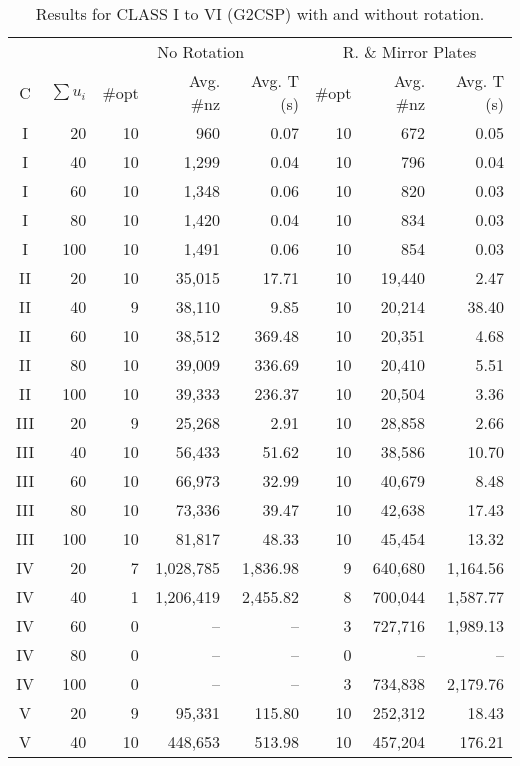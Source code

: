 \begin{table}[!t]
\centering
\caption{Results for CLASS I to VI (G2CSP) with and without rotation.}
\label{tab:g2csp_class_1to6_joined}
\begin{tabular}{crrrrrrr}
\hline\hline
& & \multicolumn{3}{c}{No Rotation} & \multicolumn{3}{c}{R. \& Mirror Plates} \\\cmidrule(lr){3-5}\cmidrule(lr){6-8}
C & \(\sum u_i\) & \#opt & Avg. \#nz & Avg. T (s) & \#opt & Avg. \#nz & Avg. T (s) \\\hline
I &  20 & 10 & 960 & 0.07 & 10 & 672 & 0.05 \\
I &  40 & 10 & 1,299 & 0.04 & 10 & 796 & 0.04 \\
I &  60 & 10 & 1,348 & 0.06 & 10 & 820 & 0.03 \\
I &  80 & 10 & 1,420 & 0.04 & 10 & 834 & 0.03 \\
I & 100 & 10 & 1,491 & 0.06 & 10 & 854 & 0.03 \\
II &  20 & 10 & 35,015 & 17.71 & 10 & 19,440 & 2.47 \\
II &  40 & 9 & 38,110 & 9.85 & 10 & 20,214 & 38.40 \\
II &  60 & 10 & 38,512 & 369.48 & 10 & 20,351 & 4.68 \\
II &  80 & 10 & 39,009 & 336.69 & 10 & 20,410 & 5.51 \\
II & 100 & 10 & 39,333 & 236.37 & 10 & 20,504 & 3.36 \\
III &  20 & 9 & 25,268 & 2.91 & 10 & 28,858 & 2.66 \\
III &  40 & 10 & 56,433 & 51.62 & 10 & 38,586 & 10.70 \\
III &  60 & 10 & 66,973 & 32.99 & 10 & 40,679 & 8.48 \\
III &  80 & 10 & 73,336 & 39.47 & 10 & 42,638 & 17.43 \\
III & 100 & 10 & 81,817 & 48.33 & 10 & 45,454 & 13.32 \\
IV &  20 & 7 & 1,028,785 & 1,836.98 & 9 & 640,680 & 1,164.56 \\
IV &  40 & 1 & 1,206,419 & 2,455.82 & 8 & 700,044 & 1,587.77 \\
IV &  60 & 0 & -- & -- & 3 & 727,716 & 1,989.13 \\
IV &  80 & 0 & -- & -- & 0 & -- & -- \\
IV & 100 & 0 & -- & -- & 3 & 734,838 & 2,179.76 \\
V &  20 & 9 & 95,331 & 115.80 & 10 & 252,312 & 18.43 \\
V &  40 & 10 & 448,653 & 513.98 & 10 & 457,204 & 176.21 \\

\end{tabular}
\end{table}
